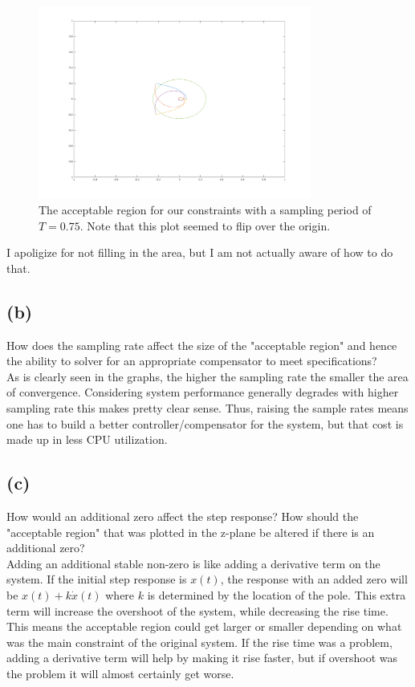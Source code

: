 \documentclass{article}
\begin{document}
\begin{figure}[H]
    \centering
    \includegraphics[width=0.8\textwidth]{PR7_t75.png}
    \caption{The acceptable region for our constraints with a sampling period of $T=0.75$. Note that this plot seemed to flip over the origin.}
\end{figure}
I apoligize for not filling in the area, but I am not actually aware of how to do that.

\subsection*{(b)}
How does the sampling rate affect the size of the "acceptable region" and hence the ability to solver for an appropriate compensator to meet specifications?\\

As is clearly seen in the graphs, the higher the sampling rate the smaller the area of convergence. Considering system performance generally degrades with higher sampling rate this makes pretty clear sense. Thus, raising the sample rates means one has to build a better controller/compensator for the system, but that cost is made up in less CPU utilization.

\subsection*{(c)}
How would an additional zero affect the step response? How should the "acceptable region" that was plotted in the z-plane be altered if there is an additional zero?\\

Adding an additional stable non-zero is like adding a derivative term on the system. If the initial step response is $x(t)$, the response with an added zero will be $x(t)+k\dot{x}(t)$ where $k$ is determined by the location of the pole. This extra term will increase the overshoot of the system, while decreasing the rise time. This means the acceptable region could get larger or smaller depending on what was the main constraint of the original system. If the rise time was a problem, adding
a derivative term will help by making it rise faster, but if overshoot was the problem it will almost certainly get worse.
\end{document}
